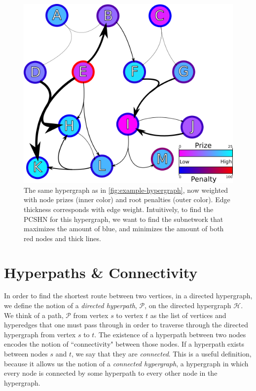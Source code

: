 \documentclass[12pt,twoside]{reedthesis}
\theoremstyle{definition}
\begin{document}
\begin{figure}[thbp]
  \begin{center}
    \includegraphics[width=\textwidth]{example-hypergraph-weighted}
  \caption[A weighted hypergraph]{The same hypergraph as in \ref{fig:example-hypergraph}, now weighted with node prizes (inner color) and root penalties (outer color). Edge thickness corresponds with edge weight. Intuitively, to find the PCSHN for this hypergraph, we want to find the subnetwork that maximizes the amount of blue, and minimizes the amount of both red nodes and thick lines.}
  \label{fig:example-hypergraph-weighted}
  \end{center}
\end{figure}

\section{Hyperpaths \& Connectivity}
In order to find the shortest route between two vertices, in a directed hypergraph, we define the notion of a \textit{directed hyperpath}, $\mathcal{P}$, on the directed hypergraph $\mathcal{H}$.  We think of a path, $\mathcal{P}$ from vertex $s$ to vertex $t$ as the list of vertices and hyperedges that one must pass through in order to traverse through the directed hypergraph from vertex $s$ to $t$. The existence of a hyperpath between two nodes encodes the notion of ``connectivity" between those nodes.  If a hyperpath exists between nodes $s$ and $t$, we say that they are \textit{connected}. This is a useful definition, because it allows us the notion of a \textit{connected hypergraph}, a hypergraph in which every node is connected by some hyperpath to every other node in the hypergraph.\par
\end{document}
